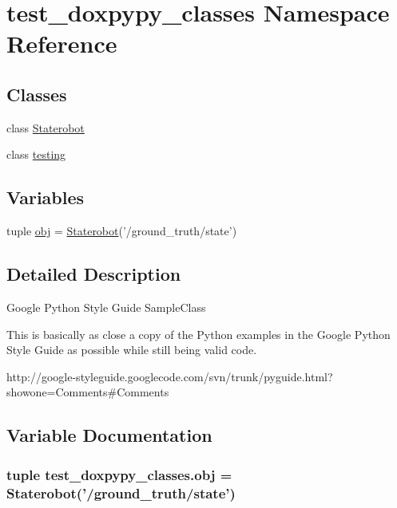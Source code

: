 \hypertarget{namespacetest__doxpypy__classes}{\section{test\+\_\+doxpypy\+\_\+classes Namespace Reference}
\label{namespacetest__doxpypy__classes}
}
\subsection*{Classes}
\begin{DoxyCompactItemize}
\item 
class \hyperlink{classtest__doxpypy__classes_1_1_staterobot}{Staterobot}
\item 
class \hyperlink{classtest__doxpypy__classes_1_1testing}{testing}
\end{DoxyCompactItemize}
\subsection*{Variables}
\begin{DoxyCompactItemize}
\item 
tuple \hyperlink{namespacetest__doxpypy__classes_a4919432926c4ea5179534f4abca62821}{obj} = \hyperlink{classtest__doxpypy__classes_1_1_staterobot}{Staterobot}('/ground\+\_\+truth/state')
\end{DoxyCompactItemize}


\subsection{Detailed Description}
\begin{DoxyVerb}Google Python Style Guide SampleClass

This is basically as close a copy of the Python examples in the Google
Python Style Guide as possible while still being valid code.

http://google-styleguide.googlecode.com/svn/trunk/pyguide.html?showone=Comments#Comments
\end{DoxyVerb}
 

\subsection{Variable Documentation}
\hypertarget{namespacetest__doxpypy__classes_a4919432926c4ea5179534f4abca62821}{
\subsubsection[{obj}]{\setlength{\rightskip}{0pt plus 5cm}tuple test\+\_\+doxpypy\+\_\+classes.\+obj = {\bf Staterobot}('/ground\+\_\+truth/state')}}\label{namespacetest__doxpypy__classes_a4919432926c4ea5179534f4abca62821}
